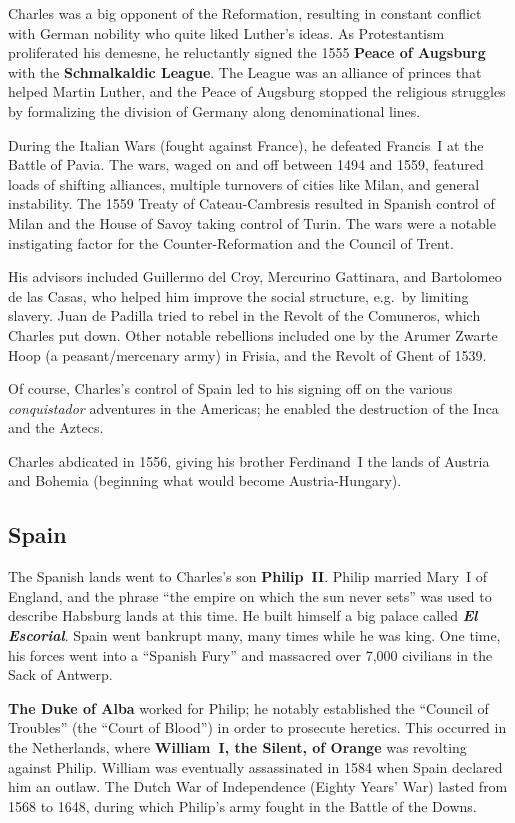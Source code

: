 Charles was a big opponent of the Reformation,
resulting in constant conflict with German nobility who quite liked Luther's ideas.
As Protestantism proliferated his demesne,
he reluctantly signed the 1555 \textbf{Peace of Augsburg} with the \textbf{Schmalkaldic League}.
The League was an alliance of princes that helped Martin Luther,
and the Peace of Augsburg stopped the religious struggles
by formalizing the division of Germany along denominational lines.

During the Italian Wars (fought against France), he defeated Francis~I at the Battle of Pavia.
The wars, waged on and off between 1494 and 1559,
featured loads of shifting alliances, multiple turnovers of cities like Milan,
and general instability.
The 1559 Treaty of Cateau-Cambresis resulted in Spanish control of Milan
and the House of Savoy taking control of Turin.
The wars were a notable instigating factor for the Counter-Reformation and the Council of Trent.

His advisors included Guillermo del Croy, Mercurino Gattinara, and Bartolomeo de las Casas,
who helped him improve the social structure, e.g.\ by limiting slavery.
Juan de Padilla tried to rebel in the Revolt of the Comuneros, which Charles put down.
Other notable rebellions included one by the Arumer Zwarte Hoop (a peasant/mercenary army) in Frisia,
and the Revolt of Ghent of 1539.

Of course, Charles's control of Spain led to his signing off on the various \textit{conquistador}
adventures in the Americas;
he enabled the destruction of the Inca and the Aztecs.

Charles abdicated in 1556, giving his brother Ferdinand~I the lands of Austria and Bohemia
(beginning what would become Austria-Hungary).

\subsection*{Spain}

The Spanish lands went to Charles's son \textbf{Philip~II}.
Philip married Mary~I of England, and the phrase ``the empire on which the sun never sets''
was used to describe Habsburg lands at this time.
He built himself a big palace called \textbf{\textit{El Escorial}}.
Spain went bankrupt many, many times while he was king.
One time,
his forces went into a ``Spanish Fury'' and massacred over 7,000 civilians in the Sack of Antwerp.

\textbf{The Duke of Alba} worked for Philip;
he notably established the ``Council of Troubles'' (the ``Court of Blood'')
in order to prosecute heretics.
This occurred in the Netherlands,
where \textbf{William~I, the Silent, of Orange} was revolting against Philip.
William was eventually assassinated in 1584 when Spain declared him an outlaw.
The Dutch War of Independence (Eighty Years' War) lasted from 1568 to 1648,
during which Philip's army fought in the Battle of the Downs.

